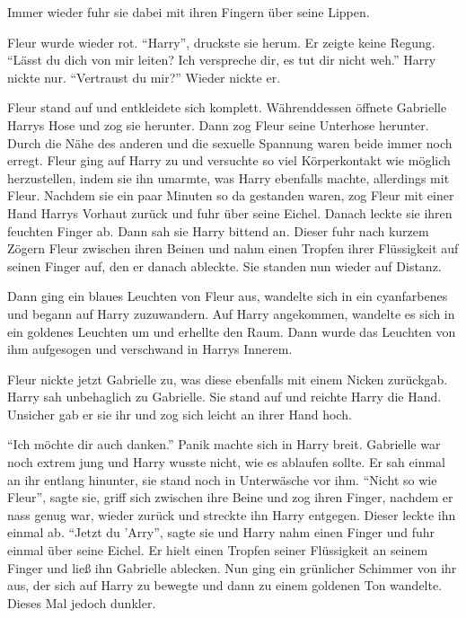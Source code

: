 Immer wieder fuhr sie dabei mit ihren Fingern über seine Lippen. 


Fleur wurde wieder rot.  \enquote{Harry}, druckste sie herum. Er zeigte keine Regung. \enquote{Lässt du dich von mir leiten? \gst Ich verspreche dir, es tut dir nicht weh.} Harry nickte nur. \enquote{Vertraust du mir?} Wieder nickte er.

Fleur stand auf und entkleidete sich komplett. Währenddessen öffnete Gabrielle Harrys Hose und zog sie herunter. Dann zog Fleur seine Unterhose herunter. Durch die Nähe des anderen und die sexuelle Spannung waren beide immer noch erregt. Fleur ging auf Harry zu und versuchte so viel Körperkontakt wie möglich herzustellen, indem sie ihn umarmte, was Harry ebenfalls machte, allerdings mit Fleur. Nachdem sie ein paar Minuten so da gestanden waren, zog Fleur mit einer Hand Harrys Vorhaut zurück und fuhr über seine Eichel. Danach leckte sie ihren feuchten Finger ab. Dann sah sie Harry bittend an. Dieser fuhr nach kurzem Zögern Fleur zwischen ihren Beinen und nahm einen Tropfen ihrer Flüssigkeit auf seinen Finger auf, den er danach ableckte. Sie standen nun wieder auf Distanz.

Dann ging ein blaues Leuchten von Fleur aus, wandelte sich in ein cyanfarbenes und begann auf Harry zuzuwandern. Auf Harry angekommen, wandelte es sich in ein goldenes Leuchten um und erhellte den Raum. Dann wurde das Leuchten von ihm aufgesogen und verschwand in Harrys Innerem.

Fleur nickte jetzt Gabrielle zu, was diese ebenfalls mit einem Nicken zurückgab. Harry sah unbehaglich zu Gabrielle. Sie stand auf und reichte Harry die Hand. Unsicher gab er sie ihr und zog sich leicht an ihrer Hand hoch.

\enquote{Ich möchte dir auch danken.} Panik machte sich in Harry breit. Gabrielle war noch extrem jung und Harry wusste nicht, wie es ablaufen sollte. Er sah einmal an ihr entlang hinunter, sie stand noch in Unterwäsche vor ihm. \enquote{Nicht so wie Fleur}, sagte sie, griff sich zwischen ihre Beine und zog ihren Finger, nachdem er nass genug war, wieder zurück und streckte ihn Harry entgegen. Dieser leckte ihn einmal ab. \enquote{Jetzt du 'Arry}, sagte sie und Harry nahm einen Finger und fuhr einmal über seine Eichel. Er hielt einen Tropfen seiner Flüssigkeit an seinem Finger und ließ ihn Gabrielle ablecken. Nun ging ein grünlicher Schimmer von ihr aus, der sich auf Harry zu bewegte und dann zu einem goldenen Ton wandelte. Dieses Mal jedoch dunkler.

